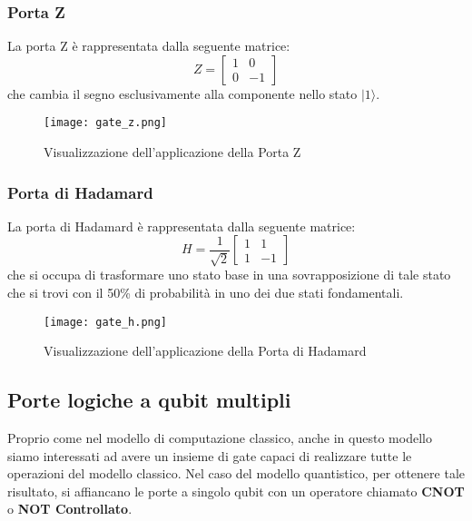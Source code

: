 \subsubsection{Porta Z}
La porta Z è rappresentata dalla seguente matrice:
\[
  Z
  =
  \begin{bmatrix}
    1 & 0 \\
    0 & -1
  \end{bmatrix}
\]
che cambia il segno esclusivamente alla componente nello stato \( | 1 \rangle \).

\begin{figure}[h]
  \centering
  \texttt{[image: gate\_z.png]}
  \caption{Visualizzazione dell'applicazione della Porta Z}
  \label{fig:gate_z}
\end{figure}

\subsubsection{Porta di Hadamard}
La porta di Hadamard è rappresentata dalla seguente matrice:
\[
  H
  =
  \frac{1}{\sqrt{2}}
  \begin{bmatrix}
    1 & 1 \\
    1 & -1
  \end{bmatrix}
\]
che si occupa di trasformare uno stato base in una sovrapposizione di tale stato che si trovi con il 50\% di probabilità in uno dei due stati fondamentali.

\begin{figure}[h]
  \centering
  \texttt{[image: gate\_h.png]}
  \caption{Visualizzazione dell'applicazione della Porta di Hadamard}
  \label{fig:gate_h}
\end{figure}

\subsection{Porte logiche a qubit multipli}
Proprio come nel modello di computazione classico, anche in questo modello siamo interessati ad avere un insieme di gate capaci di realizzare tutte le operazioni del modello classico. Nel caso del modello quantistico, per ottenere tale risultato, si affiancano le porte a singolo qubit con un operatore chiamato \textbf{CNOT} o \textbf{NOT Controllato}.

